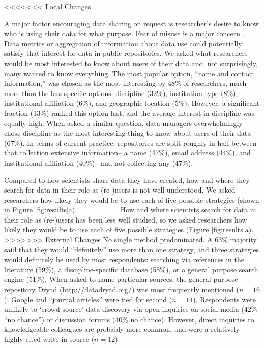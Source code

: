 \documentclass[english]{article}
\begin{document}
<<<<<<< Local Changes


A major factor encouraging data sharing on request is researcher's desire to know who is using their data for what purpose.
Fear of misuse is a major concern \cite{kuula_open_2008, kuipers_insight_2009}.
Data metrics or aggregation of information about data use could potentially satisfy that interest for data in public repositories.
We asked what researchers would be most interested to know about users of their data and, not surprisingly, many wanted to know everything.
The most popular option, ``name and contact information,'' was chosen as the most interesting by 48\% of researchers, much more than the less-specific options: discipline (32\%), institution type (8\%), institutional affiliation (6\%), and geographic location (5\%).
However, a significant fraction (13\%) ranked this option last, and the average interest in discipline was equally high.
When asked a similar question, data managers overwhelmingly chose discipline as the most interesting thing to know about users of their data (67\%).
In terms of current practice, repositories are split roughly in half between that collection extensive information-- a name (47\%), email address (44\%), and institutional affiliation (40\%)-- and not collecting any (47\%).



Compared to how scientists share data they have created, how and where they search for data in their role as (re-)users is not well understood.
We asked researchers how likely they would be to use each of five possible strategies (shown in Figure \ref{fig:results}a).
=======
How and where scientists search for data in their role as (re-)users has been less well studied, so we asked researchers how likely they would be to use each of five possible strategies (Figure \ref{fig:results}a).
>>>>>>> External Changes
No single method predominated.
A 63\% majority said that they would ``definitely'' use more than one strategy, and three strategies would definitely be used by most respondents: searching via references in the literature (59\%), a discipline-specific database (58\%), or a general purpose search engine (51\%). 
When asked to name particular sources, the general-purpose repository Dryad (\url{http://datadryad.org/}) was most frequently mentioned ($n=16$); Google and ``journal articles'' were tied for second ($n=14$). 
Respondents were unlikely to `crowd-source' data discovery via open inquiries on social media (42\% ``no chance'') or discussion forums (40\% no chance).
However, direct inquiries to knowledgeable colleagues are probably more common, and were a relatively highly cited write-in source ($n=12$).
\end{document}

